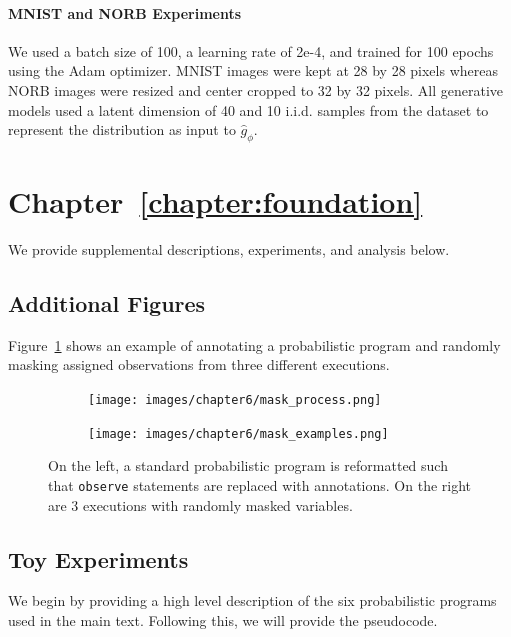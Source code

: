 \paragraph{MNIST and NORB Experiments} We used a batch size of 100, a learning rate of 2e-4, and trained for 100 epochs using the Adam optimizer. MNIST images were kept at 28 by 28 pixels whereas NORB images were resized and center cropped to 32 by 32 pixels. All generative models used a latent dimension of 40 and 10 i.i.d. samples from the dataset to represent the distribution as input to $\hat{g}_{\phi}$. 


\section{Chapter~\ref{chapter:foundation}}

We provide supplemental descriptions, experiments, and analysis below.

\subsection{Additional Figures}

Figure~\ref{fig:data} shows an example of annotating a probabilistic program and randomly masking assigned observations from three different executions.

\begin{figure}[h!]
  \centering
  \begin{subfigure}[b]{0.40\textwidth}
    \texttt{[image: images/chapter6/mask\_process.png]}
    \caption{}
  \end{subfigure}
  \hfill
  \begin{subfigure}[b]{0.49\textwidth}
    \centering
    \texttt{[image: images/chapter6/mask\_examples.png]}
    \caption{}
  \end{subfigure}
  \caption{On the left, a standard probabilistic program is reformatted such that \texttt{observe} statements are replaced with annotations. On the right are 3  executions with randomly masked variables.}
  \label{fig:data}
\end{figure}

\subsection{Toy Experiments}
\label{sec:app:mli}

We begin by providing a high level description of the six probabilistic programs used in the main text. Following this, we will provide the pseudocode.

